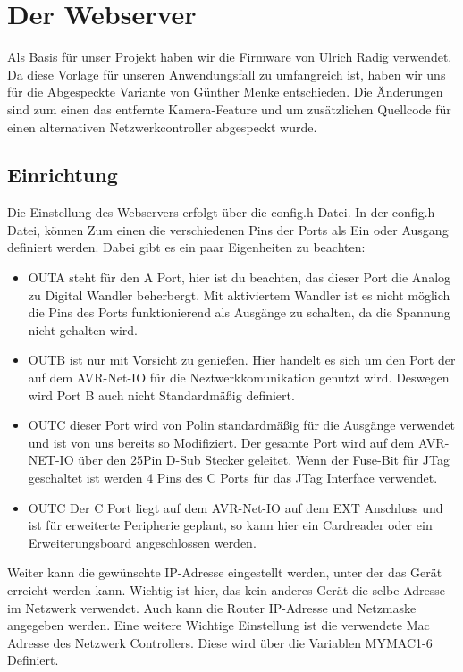 \chapter{Der Webserver}

Als Basis für unser Projekt haben wir die Firmware von Ulrich Radig verwendet.
Da diese Vorlage für unseren Anwendungsfall zu umfangreich ist,  haben wir uns 
für die Abgespeckte Variante von Günther Menke entschieden. Die Änderungen sind
zum einen das entfernte Kamera-Feature und um zusätzlichen Quellcode für einen
alternativen Netzwerkcontroller abgespeckt wurde.

\section{Einrichtung}

Die Einstellung des Webservers erfolgt über die \textrm{config.h} Datei. In der
\textrm{config.h} Datei, können Zum einen die verschiedenen Pins der Ports als Ein oder
Ausgang definiert werden. Dabei gibt es ein paar Eigenheiten zu beachten:
\begin{itemize}
  \item OUTA steht für den A Port, hier ist du beachten, das dieser Port die
  Analog zu Digital Wandler beherbergt. Mit aktiviertem Wandler ist es nicht
  möglich die Pins des Ports funktionierend als Ausgänge zu schalten, da die
  Spannung nicht gehalten wird.
  \item OUTB ist nur mit Vorsicht zu genießen. Hier handelt es sich um den Port
  der auf dem AVR-Net-IO für die Neztwerkkomunikation genutzt wird. Deswegen
  wird Port B auch nicht Standardmäßig definiert.
  \item OUTC dieser Port wird von Polin standardmäßig für die Ausgänge verwendet
  und ist von uns bereits so Modifiziert. Der gesamte Port wird auf dem
  AVR-NET-IO über den 25Pin D-Sub Stecker geleitet. Wenn der Fuse-Bit für JTag
  geschaltet ist werden 4 Pins des C Ports für das JTag Interface verwendet.
  \item OUTC Der C Port liegt auf dem AVR-Net-IO auf dem EXT Anschluss und ist
  für erweiterte Peripherie geplant, so kann hier ein Cardreader oder ein
  Erweiterungsboard angeschlossen werden.
\end{itemize}
Weiter kann die gewünschte IP-Adresse eingestellt werden, unter der das Gerät
erreicht werden kann. Wichtig ist hier, das kein anderes Gerät die selbe Adresse
im Netzwerk verwendet. Auch kann die Router IP-Adresse und Netzmaske angegeben
werden. Eine weitere Wichtige Einstellung ist die verwendete Mac Adresse
des Netzwerk Controllers. Diese wird über die Variablen MYMAC1-6 Definiert.

